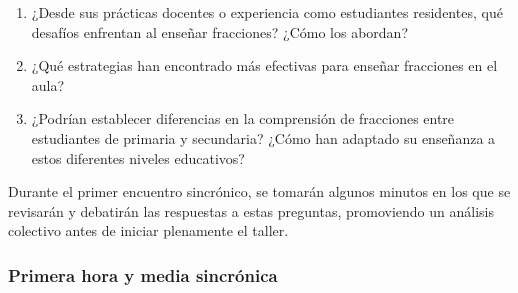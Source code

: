 \bigskip
\begin{center}
	\begin{minipage}{0.8\linewidth}
		\itshape
		\begin{enumerate}[1.]
			\item ¿Desde sus prácticas docentes o experiencia como estudiantes residentes, qué desafíos enfrentan al enseñar fracciones? ¿Cómo los abordan?
			\item ¿Qué estrategias han encontrado más efectivas para enseñar fracciones en el aula?
			\item ¿Podrían establecer diferencias en la comprensión de fracciones entre estudiantes de primaria y secundaria? ¿Cómo han adaptado su enseñanza a estos diferentes niveles educativos?
		\end{enumerate}
	\end{minipage}
\end{center}
\bigskip

Durante el primer encuentro sincrónico, se tomarán algunos minutos en los que se revisarán y debatirán las respuestas a estas preguntas, promoviendo un análisis colectivo antes de iniciar plenamente el taller.

\subsubsection{Primera hora y media sincrónica}

